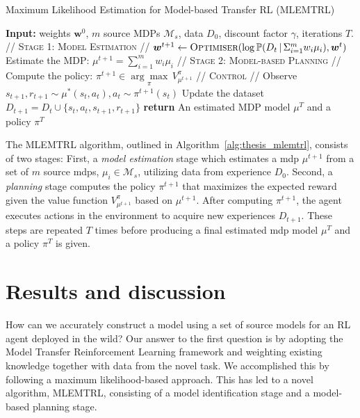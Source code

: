 \begin{algorithm}[t!]
  \caption{Maximum Likelihood Estimation for Model-based Transfer RL (MLEMTRL)}\label{alg:thesis_mlemtrl}
  \begin{algorithmic}[1]
  \State \textbf{Input:} weights $\bm{w}^0$, $m$ source MDPs $\mathcal{M}_s$, data $D_0$, discount factor $\gamma$, iterations $T$.
  \State\textsc{// Stage 1: Model Estimation //}
  \State $\bm{w}^{t+1}\leftarrow  \textsc{Optimiser}(\log\mathbb{P}(D_t \, | \, \Sigma_{i=1}^m w_i \mu_i), \bm{w}^t)$
  \State Estimate the MDP: $\mu^{t+1} = \sum_{i=1}^m w_i \mu_i$
  \State\textsc{// Stage 2: Model-based Planning //}
  \State Compute the policy: $\pi^{t+1} \in \underset{\pi}{\arg\max} \, V_{\mu^{t+1}}^\pi$
  \State\textsc{// Control //}
  \State Observe $s_{t+1}, r_{t+1} \sim \mu^{*}(s_t, a_t), a_t\sim \pi^{t+1}(s_t)$
  \State Update the dataset $D_{t+1} = D_t \cup \{s_t, a_t, s_{t+1}, r_{t+1}\}$
  \EndFor
  \State \textbf{return} An estimated MDP model $\mu^T$ and a policy $\pi^T$
  \end{algorithmic}
\end{algorithm}

The MLEMTRL algorithm, outlined in Algorithm~\ref{alg:thesis_mlemtrl}, consists of two stages: First, a \textit{model estimation} stage which estimates a \gls{mdp} $\mu^{t+1}$ from a set of $m$ source \gls{mdp}s, $\mu_i \in \mathcal{M}_s$, utilizing data from experience $D_0$.
Second, a \textit{planning} stage computes the policy $\pi^{t+1}$ that maximizes the expected reward given the value function $V_{\mu^{t+1}}^\pi$ based on $\mu^{t+1}$. 
After computing $\pi^{t+1}$, the agent executes actions in the environment to acquire new experiences $D_{t+1}$. These steps are repeated $T$ times before producing a final estimated \gls{mdp} model $\mu^T$ and a policy $\pi^T$ is given.

\section{Results and discussion}
How can we accurately construct a model using a set of source models for an RL agent deployed in the wild?
Our answer to the first question is by adopting the Model Transfer Reinforcement Learning framework and weighting existing knowledge together with data from the novel task. We accomplished this by following a maximum likelihood-based approach. This has led to a novel algorithm, MLEMTRL, consisting of a model identification stage and a model-based planning stage.

